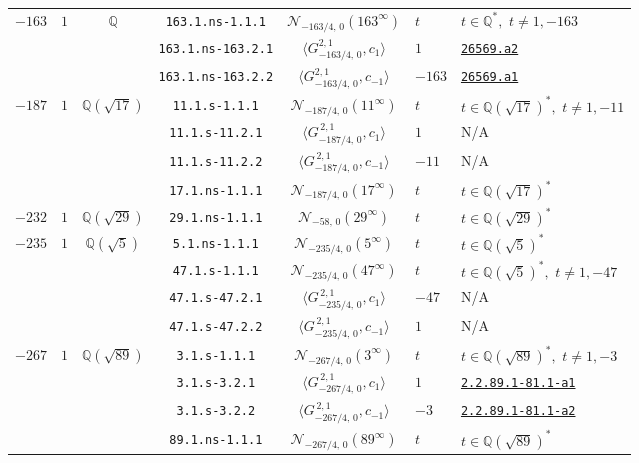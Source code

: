 \documentclass[11pt]{amsart}
\newcommand{\eclabel}[1]{\href{https://www.lmfdb.org/EllipticCurve/Q/#1}{\texttt{#1}}}
\newcommand{\ecnflabel}[2]{\href{https://www.lmfdb.org/EllipticCurve/#1-#2}{\texttt{#1-#2}}}
\theoremstyle{definition}
\newcommand{\Q}{\mathbb Q}
\newcommand{\QQ}{\mathbb Q}
\begin{document}
{\begin{longtable}{|c|c|c|c|c|l|l|}
{$-163$} & {$1$}  & {$\QQ$}   
& \texttt{163.1.ns-1.1.1} & $\mathcal{N}_{-163/4,\,0}(163^{\infty})$ &   $t$ &  $t\in \Q^*,\,\,t\ne 1,-163 $ \\ \cline{4-7} 
 & &  & \texttt{163.1.ns-163.2.1} & $\langle G^{2,1}_{-163/4,\,0},c_{1}\rangle$ &   $1$ &  \eclabel{26569.a2} \\ \cline{4-7} 
 & &  & \texttt{163.1.ns-163.2.2} & $\langle G^{2,1}_{-163/4,\,0},c_{-1}\rangle$ &   $-163$ & \eclabel{26569.a1}  \\ \hline
{$-187$} & {$1$} &  {$\Q(\sqrt{17})$} 
 & \texttt{11.1.s-1.1.1} & $\mathcal{N}_{-187/4,\,0}(11^{\infty})$ &   $t$ &  $t\in \Q(\sqrt{17})^*,\,\,t\ne 1,-11 $ \\ \cline{4-7} 
&  & & \texttt{11.1.s-11.2.1} & $\langle G^{\,2,1}_{-187/4,\,0},c_{1}\rangle$ &   $1$ &  N/A \\ \cline{4-7} 
&  & & \texttt{11.1.s-11.2.2} & $\langle G^{\, 2,1}_{-187/4,\,0},c_{-1}\rangle$ &   $-11$ &   N/A \\ \cline{4-7} 
&  & & \texttt{17.1.ns-1.1.1} & $\mathcal{N}_{-187/4,\,0}(17^{\infty})$ &   $t$ &  $t\in \Q(\sqrt{17})^*$ \\ \hline
$-232$ &$1$ & $\Q(\sqrt{29})$ & \texttt{29.1.ns-1.1.1} & $\mathcal{N}_{-58,\,0}(29^{\infty})$ &   $t$ &  $t\in \Q(\sqrt{29})^*$ \\ \hline
{$-235$}&   {$1$} &  {$\Q(\sqrt{5})$} 
 & \texttt{5.1.ns-1.1.1} & $\mathcal{N}_{-235/4,\,0}(5^{\infty})$ &   $t$ &  $t\in \Q(\sqrt{5})^*$ \\ \cline{4-7} 
&  & & \texttt{47.1.s-1.1.1} & $\mathcal{N}_{-235/4,\,0}(47^{\infty})$ &   $t$ &  $t\in \Q(\sqrt{5})^*,\,\,t\ne 1,-47 $ \\ \cline{4-7} 
&  & & \texttt{47.1.s-47.2.1} & $\langle G^{\,2,1}_{-235/4,\,0},c_{1}\rangle$ &   $-47$ &  N/A \\ \cline{4-7} 
&  & & \texttt{47.1.s-47.2.2} & $\langle G^{\, 2,1}_{-235/4,\,0},c_{-1}\rangle$ &   $1$ &  N/A \\ \hline
{$-267$} & {$1$} &  {$\Q(\sqrt{89})$} 
 & \texttt{3.1.s-1.1.1} & $\mathcal{N}_{-267/4,\,0}(3^{\infty})$ &   $t$ &  $t\in \Q(\sqrt{89})^*,\,\,t\ne 1,-3 $ \\ \cline{4-7} 
& &  & \texttt{3.1.s-3.2.1} & $\langle G^{\,2,1}_{-267/4,\,0},c_{1}\rangle$ &   $1$ & \ecnflabel{2.2.89.1}{81.1-a1}  \\ \cline{4-7} 
& &  & \texttt{3.1.s-3.2.2} & $\langle G^{\, 2,1}_{-267/4,\,0},c_{-1}\rangle$ &   $-3$ &  \ecnflabel{2.2.89.1}{81.1-a2} \\ \cline{4-7} 
& &  & \texttt{89.1.ns-1.1.1} & $\mathcal{N}_{-267/4,\,0}(89^{\infty})$ &   $t$ &  $t\in \Q(\sqrt{89})^*$ \\ \hline

\end{longtable}}
\end{document}
